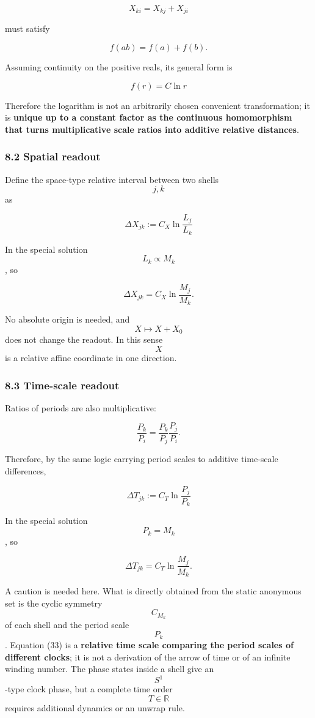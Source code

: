 \documentclass[
  a4paper,
]{article}
\begin{document}
\[
X_{ki}=X_{kj}+X_{ji}
\]

must satisfy

\[
f(ab)=f(a)+f(b).
\]

Assuming continuity on the positive reals, its general form is

\[
\boxed{
f(r)=C\ln r
}
\tag{30}
\]

Therefore the logarithm is not an arbitrarily chosen convenient
transformation; it is \textbf{unique up to a constant factor as the
continuous homomorphism that turns multiplicative scale ratios into
additive relative distances}.

\subsubsection{8.2 Spatial readout}\label{spatial-readout}

Define the space-type relative interval between two shells \[j,k\] as

\[
\boxed{
\Delta X_{jk}
:=
C_X\ln\frac{L_j}{L_k}
}
\tag{31}
\]

In the special solution \[L_k\propto M_k\], so

\[
\Delta X_{jk}
=
C_X\ln\frac{M_j}{M_k}.
\tag{32}
\]

No absolute origin is needed, and \[X\mapsto X+X_0\] does not change the
readout. In this sense \[X\] is a relative affine coordinate in one
direction.

\subsubsection{8.3 Time-scale readout}\label{time-scale-readout}

Ratios of periods are also multiplicative:

\[
\frac{P_k}{P_i}
=
\frac{P_k}{P_j}\frac{P_j}{P_i}.
\]

Therefore, by the same logic carrying period scales to additive
time-scale differences,

\[
\boxed{
\Delta T_{jk}
:=
C_T\ln\frac{P_j}{P_k}
}
\tag{33}
\]

In the special solution \[P_k=M_k\], so

\[
\Delta T_{jk}
=
C_T\ln\frac{M_j}{M_k}.
\tag{34}
\]

A caution is needed here. What is directly obtained from the static
anonymous set is the cyclic symmetry \[C_{M_k}\] of each shell and the
period scale \[P_k\]. Equation (33) is a \textbf{relative time scale
comparing the period scales of different clocks}; it is not a derivation
of the arrow of time or of an infinite winding number. The phase states
inside a shell give an \[S^1\]-type clock phase, but a complete time
order \[T\in\mathbb R\] requires additional dynamics or an unwrap rule.
\end{document}
